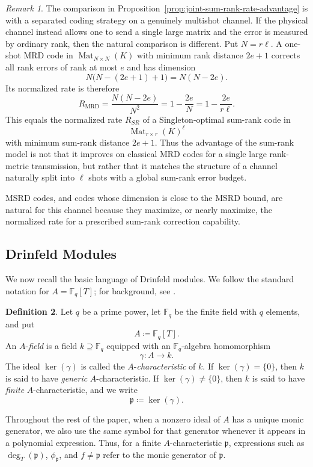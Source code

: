 \documentclass[10pt,a4paper]{amsart}
\DeclareMathOperator{\Mat}{Mat}
\theoremstyle{definition}
\newtheorem{definition}{Definition}[section]
\theoremstyle{plain}
\theoremstyle{remark}
\newtheorem{remark}[definition]{Remark}
\newcommand{\vF}{\mathbb F}
\newcommand{\p}{\mathfrak p}
\begin{document}
\begin{remark}
The comparison in Proposition~\ref{prop:joint-sum-rank-rate-advantage} is with a separated coding strategy on a genuinely multishot channel. If the physical channel instead allows one to send a single large matrix and the error is measured by ordinary rank, then the natural comparison is different. Put $N=r\ell$. A one-shot MRD code in $\Mat_{N\times N}(K)$ with minimum rank distance $2e+1$ corrects all rank errors of rank at most $e$ and has dimension
$$
N\bigl(N-(2e+1)+1\bigr)=N(N-2e).
$$
Its normalized rate is therefore
$$
R_{\mathrm{MRD}}
=
\frac{N(N-2e)}{N^2}
=
1-\frac{2e}{N}
=
1-\frac{2e}{r\ell}.
$$
This equals the normalized rate $R_{SR}$ of a Singleton-optimal sum-rank code in
$$
\Mat_{r\times r}(K)^\ell
$$
with minimum sum-rank distance $2e+1$. Thus the advantage of the sum-rank model is not that it improves on classical MRD codes for a single large rank-metric transmission, but rather that it matches the structure of a channel naturally split into $\ell$ shots with a global sum-rank error budget.
\end{remark}

MSRD codes, and codes whose dimension is close to the MSRD bound, are natural for this channel because they maximize, or nearly maximize, the normalized rate for a prescribed sum-rank correction capability.

\subsection{Drinfeld Modules}

We now recall the basic language of Drinfeld modules. We follow the standard notation for $A=\vF_q[T]$; for background, see \cite{Pap23}.

\begin{definition}
Let $q$ be a prime power, let $\vF_q$ be the finite field with $q$ elements, and put
$$
A\coloneqq \vF_q[T].
$$
An $A$-\emph{field} is a field $k\supseteq \vF_q$ equipped with an $\vF_q$-algebra homomorphism
$$
\gamma:A\longrightarrow k.
$$
The ideal $\ker(\gamma)$ is called the $A$-\emph{characteristic} of $k$. If $\ker(\gamma)=\{0\}$, then $k$ is said to have \emph{generic} $A$-characteristic. If $\ker(\gamma)\neq\{0\}$, then $k$ is said to have \emph{finite} $A$-characteristic, and we write
$$
\p\coloneqq \ker(\gamma).
$$
\end{definition}

Throughout the rest of the paper, when a nonzero ideal of $A$ has a unique monic generator, we also use the same symbol for that generator whenever it appears in a polynomial expression. Thus, for a finite $A$-characteristic $\p$, expressions such as $\deg_T(\p)$, $\phi_\p$, and $f\neq\p$ refer to the monic generator of $\p$.
\end{document}
